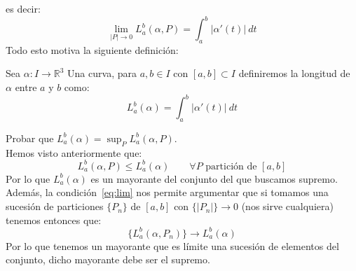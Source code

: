 es decir:
\begin{equation}\label{eq:lim}
    \lim_{|P|\to0} L_a^b(\alpha,P) =  \int_{a}^{b} |\alpha'(t)|~dt 
\end{equation}
Todo esto motiva la siguiente definición:

\begin{definicion}
    Sea $\alpha:I\to \mathbb{R}^3$ Una curva, para $a,b\in I$ con $[a,b]\subset I$ definiremos la longitud de $\alpha$ entre $a$ y $b$ como:
    \begin{equation*}
        L_a^b(\alpha) = \int_{a}^{b} |\alpha'(t)|~dt 
    \end{equation*}
\end{definicion}

\begin{ejercicio} 
    Probar que $L_a^b(\alpha) = \sup_{P}L_a^b(\alpha,P)$.\\

    \noindent
    Hemos visto anteriormente que:
    \begin{equation*}
        L_a^b(\alpha,P) \leq L_a^b(\alpha) \qquad \forall P \text{\ partición de\ } [a,b]
    \end{equation*}
    Por lo que $L_a^b(\alpha)$ es un mayorante del conjunto del que buscamos supremo. Además, la condición~\eqref{eq:lim} nos permite argumentar que si tomamos una sucesión de particiones $\{P_n\}$ de $[a,b]$ con $\{|P_n|\}\to 0$ (nos sirve cualquiera) tenemos entonces que:
    \begin{equation*}
        \{L_a^b(\alpha,P_n)\} \to L_a^b(\alpha)
    \end{equation*}
    Por lo que tenemos un mayorante que es límite una sucesión de elementos del conjunto, dicho mayorante debe ser el supremo.
\end{ejercicio}

